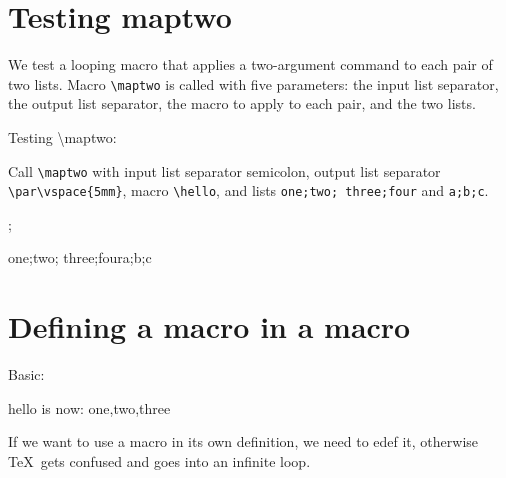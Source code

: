 \documentclass[12pt,\documentclassflag]{lawbrief}
\begin{document}
\section{Testing maptwo}

We test a looping macro that applies a two-argument command to each
pair of two lists. Macro \lstinline|\maptwo| is called with five
parameters: the input list separator, the output list separator, the
macro to apply to each pair, and the two lists.

\begin{LTXexample}
  \long{}
  \def\hello#1#2{hello #1 #2}

  Testing \textbackslash{}maptwo:

  Call \lstinline|\maptwo| with input list separator semicolon,
  output list separator \lstinline|\par\vspace{5mm}|, macro \lstinline|\hello|, and lists
  \lstinline|one;two; three;four| and \lstinline|a;b;c|.
  
  \maptwo;{\par\vspace{5mm}}{\hello}{one;two; three;four}{a;b;c}
  
\end{LTXexample}

\section{Defining a macro in a macro}

Basic: 

\begin{LTXexample}
  \def\mklst#1{\def#1{one,two,three}}
  \mklst{\hello}
  hello is now: 
  \hello 
\end{LTXexample}

If we want to use a macro in its own definition, we need to edef it,  
otherwise \TeX\ gets confused and goes into an infinite loop.  
\end{document}
